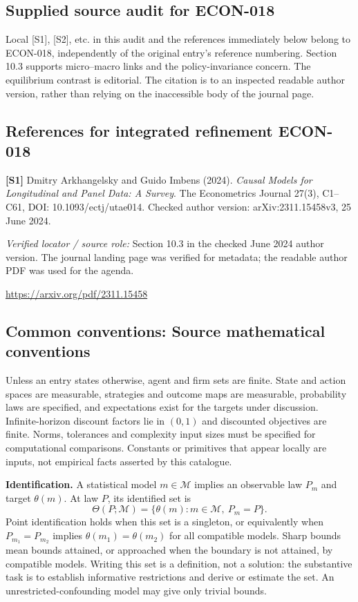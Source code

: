 \documentclass[11pt,a4paper]{article}
\begin{document}
\subsection*{Supplied source audit for ECON-018}
Local [S1], [S2], etc. in this audit and the references immediately below
belong to ECON-018, independently of the original entry's reference numbering.
Section 10.3 supports micro--macro links and the policy-invariance concern. The equilibrium contrast is editorial. The citation is to an inspected readable author version, rather than relying on the inaccessible body of the journal page.
\subsection*{References for integrated refinement ECON-018}
{\footnotesize\raggedright
\par\noindent\textbf{[S1]} Dmitry Arkhangelsky and Guido Imbens (2024). \emph{Causal Models for Longitudinal and Panel Data: A Survey}. The Econometrics Journal 27(3), C1--C61, DOI: 10.1093/ectj/utae014. Checked author version: arXiv:2311.15458v3, 25 June 2024.\par \textit{Verified locator / source role:} Section 10.3 in the checked June 2024 author version. The journal landing page was verified for metadata; the readable author PDF was used for the agenda.\par \url{https://arxiv.org/pdf/2311.15458}\par\smallskip
}

\subsection*{Common conventions: Source mathematical conventions}

Unless an entry states otherwise, agent and firm sets are finite. State and action spaces are measurable, strategies and outcome maps are measurable, probability laws are specified, and expectations exist for the targets under discussion. Infinite-horizon discount factors lie in $(0,1)$ and discounted objectives are finite. Norms, tolerances and complexity input sizes must be specified for computational comparisons. Constants or primitives that appear locally are inputs, not empirical facts asserted by this catalogue.

\textbf{Identification.} A statistical model $m\in\mathcal M$ implies an observable law $P_m$ and target $\theta(m)$. At law $P$, its identified set is
\[
\Theta(P;\mathcal M)=\{\theta(m):m\in\mathcal M,\ P_m=P\}.
\]
Point identification holds when this set is a singleton, or equivalently when $P_{m_1}=P_{m_2}$ implies $\theta(m_1)=\theta(m_2)$ for all compatible models. Sharp bounds mean bounds attained, or approached when the boundary is not attained, by compatible models. Writing this set is a definition, not a solution: the substantive task is to establish informative restrictions and derive or estimate the set. An unrestricted-confounding model may give only trivial bounds.
\end{document}
